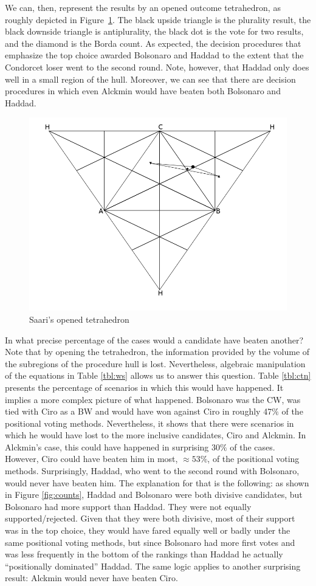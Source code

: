 \documentclass[hidelinks,11pt]{article} \usepackage[utf8]{inputenc}
\begin{document}


We can, then, represent the results by an opened outcome tetrahedron, as roughly
depicted in Figure~\ref{fig:ot}. The black upside triangle is the plurality
result, the black downside triangle is antiplurality, the black dot is the vote
for two results, and the diamond is the Borda count. As expected, the decision
procedures that emphasize the top choice awarded Bolsonaro and Haddad to the
extent that the Condorcet loser went to the second round. Note, however, that
Haddad only does well in a small region of the hull. Moreover, we can see that
there are decision procedures in which even Alckmin would have beaten both
Bolsonaro and Haddad.

\begin{figure}[!h] \centering \includegraphics[width=0.5\columnwidth,
height=0.4\textheight]{./images/opened_tetrahedron1.png}
 \caption{Saari's opened tetrahedron }
 \label{fig:ot}
\end{figure}

In what precise percentage of the cases would a candidate have beaten another?
Note that by opening the tetrahedron, the information provided by the volume of
the subregions of the procedure hull is lost. Nevertheless, algebraic
manipulation of the equations in Table \ref{tbl:ws} allows us to answer this
question. Table \ref{tbl:ctn} presents the percentage of scenarios in which this
would have happened. It implies a more complex picture of what happened.
Bolsonaro was the CW, was tied with Ciro as a BW and would have won against Ciro
in roughly 47\(\%\) of the positional voting methods. Nevertheless, it shows
that there were scenarios in which he would have lost to the more inclusive
candidates, Ciro and Alckmin. In Alckmin's case, this could have happened in
surprising \(30\%\) of the cases. However, Ciro could have beaten him in most,
\(\approx 53\%\), of the positional voting methods. Surprisingly, Haddad, who
went to the second round with Bolsonaro, would never have beaten him. The
explanation for that is the following: as shown in Figure \ref{fig:counts},
Haddad and Bolsonaro were both divisive candidates, but Bolsonaro had more
support than Haddad. They were not equally supported/rejected. Given that they
were both divisive, most of their support was in the top choice, they would have
fared equally well or badly under the same positional voting methods, but since
Bolsonaro had more first votes and was less frequently in the bottom of the
rankings than Haddad he actually ``positionally dominated'' Haddad. The same
logic applies to another surprising result: Alckmin would never have beaten
Ciro.
\end{document}
